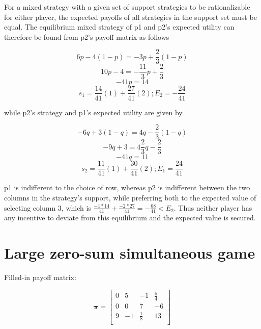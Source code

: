 \documentclass[12pt, a4paper]{article}
\begin{document}
For a mixed strategy with a given set of support strategies to be rationalizable for either player, the expected payoffs of all strategies in the support set must be equal. The equilibrium mixed strategy of p1 and p2's expected utility can therefore be found from p2's payoff matrix as follows

\begin{equation}
    6p-4(1-p) = -3p + \frac{2}{3}(1-p)
\end{equation}
\begin{equation}
    10p-4=-\frac{11}{3}p+\frac{2}{3}
\end{equation}
\begin{equation}
    -41p = 14
\end{equation}
\begin{equation}
    s_1=\frac{14}{41}(1)+\frac{27}{41}(2);E_2=-\frac{24}{41}
\end{equation}

while p2's strategy and p1's expected utility are given by

\begin{equation}
    -6q+3(1-q) = 4q - \frac{2}{3}(1-q)
\end{equation}
\begin{equation}
    -9q+3=4\frac{2}{3}q-\frac{2}{3}
\end{equation}
\begin{equation}
    -41q = 11
\end{equation}
\begin{equation}
    s_2=\frac{11}{41}(1)+\frac{30}{41}(2);E_1=\frac{24}{41}
\end{equation}

p1 is indifferent to the choice of row, whereas p2 is indifferent between the two columns in the strategy's support, while preferring both to the expected value of selecting column 3, which is $\frac{-1*14}{41}+\frac{-2*27}{41}=-\frac{68}{41}<E_2$. Thus neither player has any incentive to deviate from this equilibrium and the expected value is secured.

\section{Large zero-sum simultaneous game}

Filled-in payoff matrix:

\begin{equation}
    \boldsymbol{\pi}=\begin{bmatrix}
        0 & 5 & -1 & \frac{5}{4} \\
        0 & 0 & 7 & -6 \\
        9 & -1 & \frac{1}{8} & 13 \\ 
    \end{bmatrix}
\end{equation}
\end{document}

